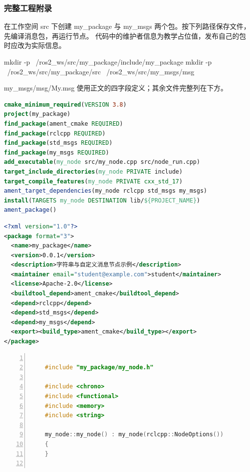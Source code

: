 
\subsubsection{完整工程附录}
\label{sec:ros2-project}
\begin{example}
在工作空间 src 下创建 my\_package 与 my\_msgs 两个包。按下列路径保存文件，先编译消息包，再运行节点。
代码中的维护者信息为教学占位值，发布自己的包时应改为实际信息。
\begin{tbash}
mkdir -p ~/ros2_ws/src/my_package/include/my_package
mkdir -p ~/ros2_ws/src/my_package/src ~/ros2_ws/src/my_msgs/msg
\end{tbash}
my\_msgs/msg/My.msg 使用正文的四字段定义；其余文件完整列在下方。


\begin{lstlisting}[language=cmake,label=lst:ament_cmake_auto_config,caption={my\_package/CMakeLists.txt}]
cmake_minimum_required(VERSION 3.8)
project(my_package)
find_package(ament_cmake REQUIRED)
find_package(rclcpp REQUIRED)
find_package(std_msgs REQUIRED)
find_package(my_msgs REQUIRED)
add_executable(my_node src/my_node.cpp src/node_run.cpp)
target_include_directories(my_node PRIVATE include)
target_compile_features(my_node PRIVATE cxx_std_17)
ament_target_dependencies(my_node rclcpp std_msgs my_msgs)
install(TARGETS my_node DESTINATION lib/${PROJECT_NAME})
ament_package()
\end{lstlisting}


\begin{lstlisting}[language=XML,label=lst:xml_1,caption={my\_package/package.xml}]
<?xml version="1.0"?>
<package format="3">
  <name>my_package</name>
  <version>0.0.1</version>
  <description>字符串与自定义消息节点示例</description>
  <maintainer email="student@example.com">student</maintainer>
  <license>Apache-2.0</license>
  <buildtool_depend>ament_cmake</buildtool_depend>
  <depend>rclcpp</depend>
  <depend>std_msgs</depend>
  <depend>my_msgs</depend>
  <export><build_type>ament_cmake</build_type></export>
</package>
\end{lstlisting}

\begin{lstlisting}[language=c++,label=lst:my_node_cpp,caption=my\_node.cpp,numbers=left]
    
    #include "my_package/my_node.h"
    
    #include <chrono>
    #include <functional>
    #include <memory>
    #include <string>
    
    my_node::my_node() : my_node(rclcpp::NodeOptions())
    {
    }
    

\end{lstlisting}
\end{example}
